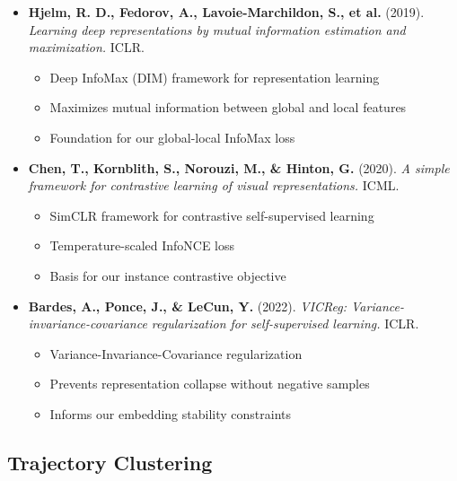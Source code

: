 \documentclass[11pt,a4paper]{article}
\begin{document}
\begin{itemize}[leftmargin=*]
    \item \textbf{Hjelm, R. D., Fedorov, A., Lavoie-Marchildon, S., et al.} (2019). \textit{Learning deep representations by mutual information estimation and maximization.} ICLR.
    \begin{itemize}
        \item Deep InfoMax (DIM) framework for representation learning
        \item Maximizes mutual information between global and local features
        \item Foundation for our global-local InfoMax loss
    \end{itemize}
    
    \item \textbf{Chen, T., Kornblith, S., Norouzi, M., \& Hinton, G.} (2020). \textit{A simple framework for contrastive learning of visual representations.} ICML.
    \begin{itemize}
        \item SimCLR framework for contrastive self-supervised learning
        \item Temperature-scaled InfoNCE loss
        \item Basis for our instance contrastive objective
    \end{itemize}
    
    \item \textbf{Bardes, A., Ponce, J., \& LeCun, Y.} (2022). \textit{VICReg: Variance-invariance-covariance regularization for self-supervised learning.} ICLR.
    \begin{itemize}
        \item Variance-Invariance-Covariance regularization
        \item Prevents representation collapse without negative samples
        \item Informs our embedding stability constraints
    \end{itemize}
\end{itemize}

\subsection{Trajectory Clustering}
\end{document}
